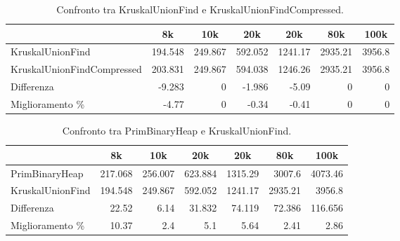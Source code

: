 \begin{table}[H]
\centering
    \hspace*{-0.25cm}
    \begin{tabular}{|l|rrrrrr|}
    \hline
    &  \multicolumn{1}{c}{8k} & \multicolumn{1}{c}{10k} & \multicolumn{1}{c}{20k} & \multicolumn{1}{c}{20k} & \multicolumn{1}{c}{80k} &           \multicolumn{1}{c|}{100k} \\
    \hline
     KruskalUnionFind           & 194.548 & 249.867 & 592.052 & 1241.17 & 2935.21 & 3956.8 \\
     KruskalUnionFindCompressed & 203.831 & 249.867 & 594.038 & 1246.26 & 2935.21 & 3956.8 \\ \hline
     Differenza                 &  -9.283 &   0     &  -1.986 &   -5.09 &    0    &    0   \\
     Miglioramento \%            &  -4.77  &   0     &  -0.34  &   -0.41 &    0    &    0     \\
    \hline
    \end{tabular}
    \caption{Confronto tra KruskalUnionFind e KruskalUnionFindCompressed.}
    \label{table:kruskal-union-find-vs-kruskal-union-find-compressed}
\end{table}

\begin{table}[H]
\centering
    \begin{tabular}{|l|rrrrrr|}
    \hline
    &  \multicolumn{1}{c}{8k} & \multicolumn{1}{c}{10k} & \multicolumn{1}{c}{20k} & \multicolumn{1}{c}{20k} & \multicolumn{1}{c}{80k} &           \multicolumn{1}{c|}{100k} \\
    \hline
     PrimBinaryHeap   & 217.068 & 256.007 & 623.884 & 1315.29  & 3007.6   & 4073.46  \\
     KruskalUnionFind & 194.548 & 249.867 & 592.052 & 1241.17  & 2935.21  & 3956.8   \\ \hline
     Differenza       &  22.52  &   6.14  &  31.832 &   74.119 &   72.386 &  116.656 \\
     Miglioramento \%  &  10.37  &   2.4   &   5.1   &    5.64  &    2.41  &    2.86 \\
    \hline
    \end{tabular}
    \caption{Confronto tra PrimBinaryHeap e KruskalUnionFind.}
    \label{table:prim-binary-heap-vs-kruskal-union-find}
\end{table}


